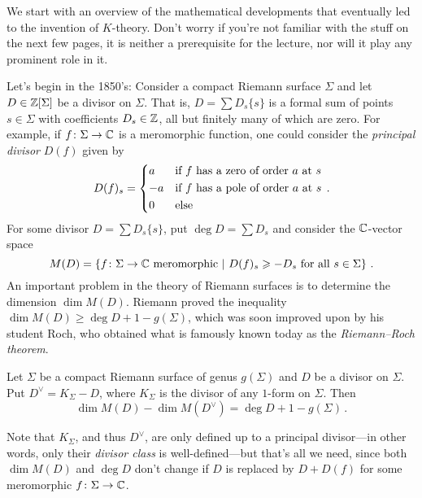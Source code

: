 	We start with an overview of the mathematical developments that eventually led to the invention of $K$-theory. Don't worry if you're not familiar with the stuff on the next few pages, it is neither a prerequisite for the lecture, nor will it play any prominent role in it.
	
	Let's begin in the 1850's: Consider a compact Riemann surface $\Sigma$ and let $D\in\mathbb{Z}[\Sigma]$ be a divisor on $\Sigma$. That is, $D=\sum D_s\{s\}$ is a formal sum of points $s\in\Sigma$ with coefficients $D_s\in\mathbb{Z}$, all but finitely many of which are zero. For example, if $f\colon \Sigma\morphism \IC$ is a meromorphic function, one could consider the \emph{principal divisor} $D(f)$ given by
	\begin{equation*}
		D(f)_s=\begin{cases*}
			a & if $f$ has a zero of order $a$ at $s$\\
			-a & if $f$ has a pole of order $a$ at $s$\\
			0 & else
		\end{cases*}\,.
	\end{equation*}
	For some divisor $D=\sum D_s\{s\}$, put $\deg D=\sum D_s$ and consider the $\mathbb{C}$-vector space
	\begin{equation*}
		M(D)=\left\{f\colon \Sigma\rightarrow\mathbb{C}\text{ meromorphic}\ \middle|\  D(f)_s\geqslant -D_s\text{ for all }s\in\Sigma\right\}\,.
	\end{equation*}
	An important problem in the theory of Riemann surfaces is to determine the dimension $\dim M(D)$. Riemann proved the inequality $\dim M(D)\geq \deg D+1-g(\Sigma)$, which was soon improved upon by his student Roch, who obtained what is famously known today as the \emph{Riemann--Roch theorem}.
	\begin{thm}\label{thm:RiemannRoch}
		Let $\Sigma$ be a compact Riemann surface of genus $g(\Sigma)$ and $D$ be a divisor on $\Sigma$. Put $D^\vee=K_\Sigma-D$, where $K_\Sigma$ is the divisor of any $1$-form on $\Sigma$. Then
		\begin{equation*}
			\dim M(D)-\dim M(D^\vee)=\deg D+1-g(\Sigma)\,.
		\end{equation*}
	\end{thm}
	Note that $K_\Sigma$, and thus $D^\vee$, are only defined up to a principal divisor---in other words, only their \emph{divisor class} is well-defined---but that's all we need, since both $\dim M(D)$ and $\deg D$ don't change if $D$ is replaced by $D+D(f)$ for some meromorphic $f\colon \Sigma\morphism\IC$. 
	
